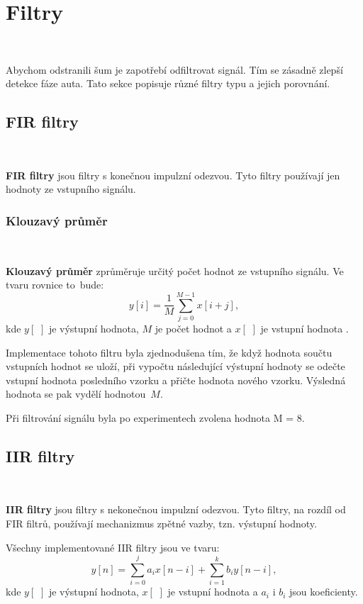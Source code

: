 \chapter{Filtry}
\label{sec:Filters}
\vspace{-30pt}
\

Abychom odstranili šum je zapotřebí odfiltrovat signál.
Tím se zásadně zlepší detekce fáze auta.
Tato sekce popisuje různé filtry typu  a jejich porovnání.

\section{FIR filtry}\

\textbf{FIR filtry} jsou filtry s konečnou impulzní odezvou. Tyto filtry používají jen
hodnoty ze vstupního signálu\cite{FIR}.

\subsection{Klouzavý průměr}\

\textbf{Klouzavý průměr} zprůměruje určitý počet hodnot ze vstupního signálu.
Ve tvaru rovnice to~bude:
\begin{equation}
y[i] = \frac{1}{M}\sum_{j = 0}^{M - 1}x[i+j],
\end{equation}
kde $y[\,\,]$ je výstupní hodnota, $M$ je počet hodnot a $x[\,\,]$ je vstupní hodnota
\cite{Filters}.

Implementace tohoto filtru byla zjednodušena tím, že když hodnota součtu vstupních hodnot se uloží, při vypočtu následující
výstupní hodnoty se odečte vstupní hodnota posledního vzorku a
přičte hodnota nového vzorku.
Výsledná hodnota se pak vydělí hodnotou~$M$\cite{krokomer}.

Při filtrování signálu byla po experimentech zvolena hodnota M = 8.

\section{IIR filtry}\

\textbf{IIR filtry} jsou filtry s nekonečnou impulzní odezvou. Tyto filtry, na rozdíl
od FIR filtrů, používají mechanizmus zpětné vazby, tzn. výstupní hodnoty\cite{IIR}.

Všechny implementované IIR filtry jsou ve tvaru:
\begin{equation}
y[n] = \sum_{i = 0}^{j}a_{i}x[n - i] + \sum_{i = 1}^{k}b_{i}y[n - i],
\end{equation}
kde $y[\,\,]$ je výstupní hodnota, $x[\,\,]$ je vstupní hodnota a $a_i$ i $b_i$
jsou koeficienty.

